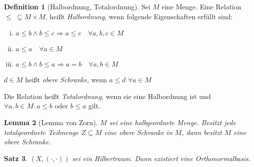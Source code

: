 \documentclass[ngerman]{report}
\theoremstyle{plain}%
\newtheorem{thm}{Satz}[chapter]
\newtheorem{lemma}[thm]{Lemma}
\theoremstyle{definition}%
\newtheorem{definition}[thm]{Definition}
\theoremstyle{myStyle}
\newcommand{\df}[1][]{%
	\overset{#1}{\Rightarrow}
}
\begin{document}
	\begin{definition}[Halbordnung, Totalordnung]
		Sei $M$ eine Menge. Eine Relation $\leq\; \subseteq M\times M$, heißt \textit{Halbordnung}, wenn folgende Eigenschaften erfüllt sind:

			\begin{enumerate}[(i)]
				\item $a\leq b \land b\leq c \df a \leq c\quad \forall a,b,c \in M$
				\item $ a \leq a \quad\forall a\in M$
				\item $ a \leq b \land b\leq a \df a = b\quad \forall a,b\in M$
			\end{enumerate}
		

			\item $d \in M$ heißt \textit{obere Schranke}, wenn $a \leq d$ $\forall a\in M$%
			\item Die Relation heißt \textit{Totalordnung}, wenn sie eine Halbordnung ist und $\forall a,b \in M: a \leq b$ oder $b \leq a$ gilt.

	\end{definition}

	\begin{lemma}[Lemma von Zorn]
		$M$ sei eine halbgeordnete Menge. Besitzt jede totalgeordnete Teilmenge $Z \subseteq M$ eine obere Schranke in $M$, dann besitzt $M$ eine obere Schranke.	
	\end{lemma}

	\begin{thm}
		$(X, (\cdot,\cdot))$ sei ein Hilbertraum. Dann existiert eine Orthonormalbasis.
	\end{thm}
\end{document}
